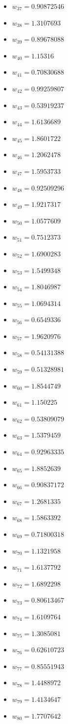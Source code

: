 \documentclass[11pt]{article}
\begin{document}
\begin{itemize}
\item $w_{37} = 0.90872546$
\item $w_{38} = 1.3107693$
\item $w_{39} = 0.89678088$
\item $w_{40} = 1.15316$
\item $w_{41} = 0.70830688$
\item $w_{42} = 0.99259807$
\item $w_{43} = 0.53919237$
\item $w_{44} = 1.6136689$
\item $w_{45} = 1.8601722$
\item $w_{46} = 1.2062478$
\item $w_{47} = 1.5953733$
\item $w_{48} = 0.92509296$
\item $w_{49} = 1.9217317$
\item $w_{50} = 1.0577609$
\item $w_{51} = 0.7512373$
\item $w_{52} = 1.6900283$
\item $w_{53} = 1.5499348$
\item $w_{54} = 1.8046987$
\item $w_{55} = 1.0694314$
\item $w_{56} = 0.6549336$
\item $w_{57} = 1.9620976$
\item $w_{58} = 0.54131388$
\item $w_{59} = 0.51328981$
\item $w_{60} = 1.8544749$
\item $w_{61} = 1.150225$
\item $w_{62} = 0.53809079$
\item $w_{63} = 1.5379459$
\item $w_{64} = 0.92963335$
\item $w_{65} = 1.8852639$
\item $w_{66} = 0.90837172$
\item $w_{67} = 1.2681335$
\item $w_{68} = 1.5863392$
\item $w_{69} = 0.71800318$
\item $w_{70} = 1.1321958$
\item $w_{71} = 1.6137792$
\item $w_{72} = 1.6892298$
\item $w_{73} = 0.80613467$
\item $w_{74} = 1.6109764$
\item $w_{75} = 1.3085081$
\item $w_{76} = 0.62610723$
\item $w_{77} = 0.85551943$
\item $w_{78} = 1.4488972$
\item $w_{79} = 1.4134647$
\item $w_{80} = 1.7707642$
\end{itemize}
\end{document}
